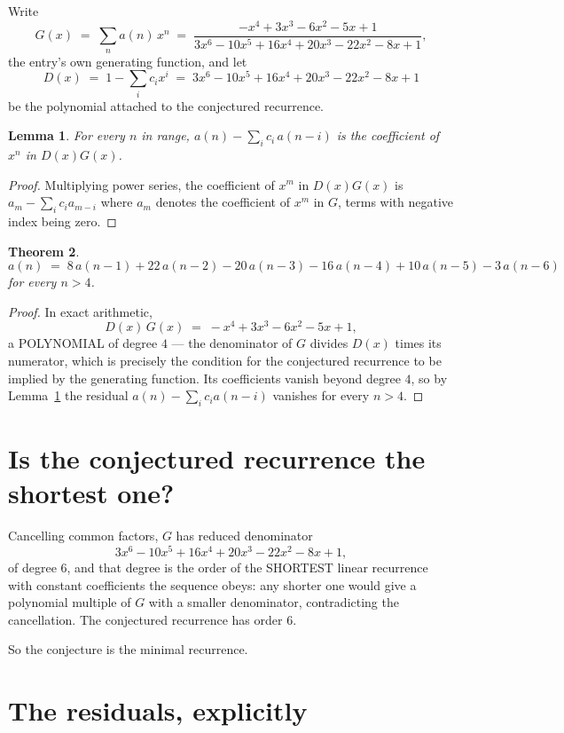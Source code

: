 \documentclass[11pt,a4paper]{article}
\theoremstyle{plain}
\newtheorem{theorem}{Theorem}
\newtheorem{lemma}[theorem]{Lemma}
\theoremstyle{definition}
\begin{document}
Write
\[
G(x)\;=\;\sum_{n}a(n)\,x^{n}\;=\;\frac{- x^{4} + 3 x^{3} - 6 x^{2} - 5 x + 1}{3 x^{6} - 10 x^{5} + 16 x^{4} + 20 x^{3} - 22 x^{2} - 8 x + 1},
\]
the entry's own generating function, and let
\[
D(x)\;=\;1-\sum_i c_i x^{i}\;=\;3 x^{6} - 10 x^{5} + 16 x^{4} + 20 x^{3} - 22 x^{2} - 8 x + 1
\]
be the polynomial attached to the conjectured recurrence.

\begin{lemma}\label{lem:key}
For every $n$ in range, $a(n)-\sum_i c_i\,a(n-i)$ is the coefficient of $x^{n}$ in
$D(x)G(x)$.
\end{lemma}

\begin{proof}
Multiplying power series, the coefficient of $x^{m}$ in $D(x)G(x)$ is
$a_m-\sum_i c_i a_{m-i}$ where $a_m$ denotes the coefficient of $x^{m}$ in $G$, terms with
negative index being zero.
\end{proof}

\begin{theorem}
\[
a(n)\;=\;8\,a(n-1) + 22\,a(n-2) - 20\,a(n-3) - 16\,a(n-4) + 10\,a(n-5) - 3\,a(n-6)
\]
for every $n>4$.
\end{theorem}

\begin{proof}
In exact arithmetic,
\[
D(x)\,G(x)\;=\;- x^{4} + 3 x^{3} - 6 x^{2} - 5 x + 1,
\]
a POLYNOMIAL of degree $4$ --- the denominator of $G$ divides $D(x)$ times its numerator,
which is precisely the condition for the conjectured recurrence to be implied by the
generating function. Its coefficients vanish beyond degree $4$, so by
Lemma~\ref{lem:key} the residual $a(n)-\sum_ic_ia(n-i)$ vanishes for every
$n>4$.
\end{proof}

\section{Is the conjectured recurrence the shortest one?}

Cancelling common factors, $G$ has reduced denominator
\[
3 x^{6} - 10 x^{5} + 16 x^{4} + 20 x^{3} - 22 x^{2} - 8 x + 1,
\]
of degree $6$, and that degree is the order of the SHORTEST linear recurrence with
constant coefficients the sequence obeys: any shorter one would give a polynomial multiple of
$G$ with a smaller denominator, contradicting the cancellation. The conjectured recurrence has
order $6$.

So the conjecture is the minimal recurrence.

\section{The residuals, explicitly}
\end{document}
